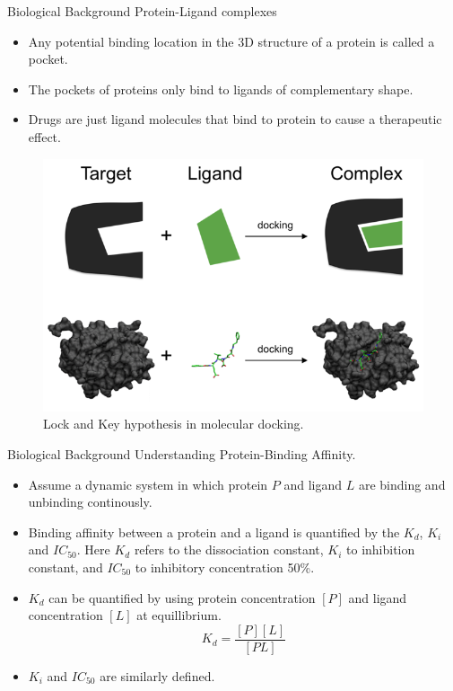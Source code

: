 \documentclass{beamer}
\begin{document}
\begin{frame}[t]{Biological Background}
Protein-Ligand complexes

\begin{itemize}
\item Any potential binding location in the 3D structure of a protein is called a
pocket.
\item The pockets of proteins only bind to ligands of complementary shape.
\item Drugs are just ligand molecules that bind to protein to cause a therapeutic effect.
\end{itemize}

\begin{figure}[htb]
  \centering
    \includegraphics[scale=0.45]{images/lock_and_key}
    \caption{Lock and Key hypothesis in molecular docking.}
    \label{fig:lockandkey}
\end{figure}


\end{frame}

\begin{frame}[t]{Biological Background}
Understanding Protein-Binding Affinity.

\begin{itemize}
\item Assume a dynamic system in which protein $P$ and ligand $L$ are binding and unbinding continously.
\item Binding affinity between a protein and a ligand is quantified by the $K_d$, $K_i$ and $IC_{50}$.
Here $K_d$ refers to the dissociation constant, $K_i$ to inhibition constant, and $IC_{50}$ to 
inhibitory concentration 50\%.
\item $K_d$ can be quantified by using protein concentration $[P]$ and ligand concentration $[L]$ at equillibrium.
$$K_d = \frac{[P][L]}{[PL]}$$
\item $K_i$ and $IC_{50}$ are similarly defined.
\end{itemize}


\end{frame}
\end{document}
